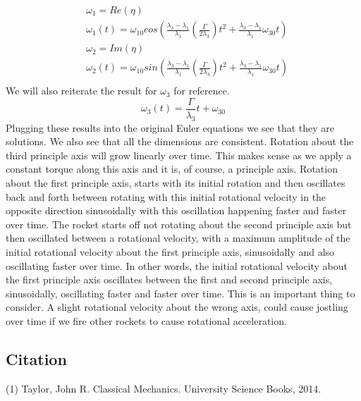 \documentclass{article}
\begin{document}
\begin{align*}
    &\omega_1 = Re(\eta) \\
    &\boxed{\omega_1(t) = \omega_{10} cos\left( \frac{\lambda_3-\lambda_1}{\lambda_1}\left( \frac{\Gamma }{2\lambda_3}\right)t^2 + \frac{\lambda_3-\lambda_1}{\lambda_1}\omega_{30} t \right)} \\
    &\omega_2 = Im(\eta) \\
    &\boxed{\omega_2(t) =\omega_{10} sin\left( \frac{\lambda_3-\lambda_1}{\lambda_1}\left( \frac{\Gamma }{2\lambda_3}\right)t^2 + \frac{\lambda_3-\lambda_1}{\lambda_1}\omega_{30} t \right)} \\
\end{align*}
We will also reiterate the result for $\omega_3$ for reference. 
$$\boxed{\omega_3(t) = \frac{\Gamma }{\lambda_3}t + \omega_{30}}$$
Plugging these results into the original Euler equations we see that they are solutions. We also see that all the dimensions are consistent. Rotation about the third principle axis will grow linearly over time. This makes sense as we apply a constant torque along this axis and it is, of course, a principle axis. Rotation about the first principle axis, starts with its initial rotation and then oscillates back and forth between rotating with this initial rotational velocity in the opposite direction sinusoidally with this oscillation happening faster and faster over time. The rocket starts off not rotating about the second principle axis but then oscillated between a rotational velocity, with a maximum amplitude of the initial rotational velocity about the first principle axis, sinusoidally and also oscillating faster over time. In other words, the initial rotational velocity about the first principle axis oscillates between the first and second principle axis, sinusoidally, oscillating faster and faster over time. This is an important thing to consider. A slight rotational velocity about the wrong axis, could cause jostling over time if we fire other rockets to cause rotational acceleration. 




\subsection*{Citation}
(1) Taylor, John R. Classical Mechanics. University Science Books, 2014. 
\end{document}
